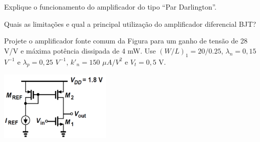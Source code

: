 \documentclass[addpoints]{exam}
\begin{document}
\begin{questions}
\question[2] Explique o funcionamento do amplificador do tipo ``Par Darlington''.

\question[1] Quais as limitações e qual a principal utilização do amplificador diferencial BJT?

\question[3] Projete o amplificador fonte comum da Figura para um ganho de tensão de 28 V/V e máxima potência dissipada de 4 mW. Use $(W/L)_1 = 20/0.25$, $\lambda_n = 0,15$ $V^{-1}$ e $\lambda_p = 0,25$ $V^{-1}$, $k'_n = 150$ $\mu A/V^2$ e $V_t = 0,5$ V.

\begin{center}
\includegraphics[width=0.4\textwidth]{imagens/4.png}
\end{center}

\end{questions}
\end{document}
